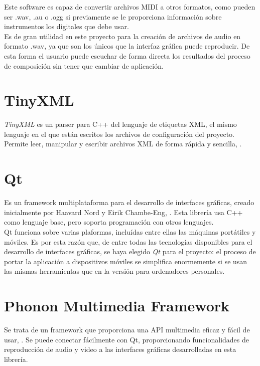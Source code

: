 Este software es capaz de convertir archivos MIDI a otros formatos, como pueden ser .wav, .au o .ogg si previamente se le proporciona información sobre instrumentos los digitales que debe usar.\\

Es de gran utilidad en este proyecto para la creación de archivos de audio en formato .wav, ya que son los únicos que la interfaz gráfica puede reproducir. De esta forma el usuario puede escuchar de forma directa los resultados del proceso de composición sin tener que cambiar de aplicación.

\section{TinyXML}
\label{sec:TinyXML}

\emph{TinyXML} es un parser para C++ del lenguaje de etiquetas XML, el mismo lenguaje en el que están escritos los archivos de configuración del proyecto. Permite leer, manipular y escribir archivos XML de forma rápida y sencilla, \cite{tinyxml}.\\

\section{Qt}
\label{sec:Qt}

Es un framework multiplataforma para el desarrollo de interfaces gráficas, creado inicialmente por Haavard Nord y Eirik Chambe-Eng, \cite{qtlibs}. Esta librería usa C++ como lenguaje base, pero soporta programación con otros lenguajes.\\

Qt funciona sobre varias plaformas, incluídas entre ellas las máquinas portátiles y móviles. Es por esta razón que, de entre todas las tecnologías disponibles para el desarrollo de interfaces gráficas, se haya elegido \emph{Qt} para el proyecto: el proceso de portar la aplicación a dispositivos móviles se simplifica enormemente si se usan las mismas herramientas que en la versión para ordenadores personales.

\section{Phonon Multimedia Framework}
\label{sec:Phonon}

Se trata de un framework que proporciona una API multimedia eficaz y fácil de usar, \cite{phononOverview}. Se puede conectar fácilmente con Qt, proporcionando funcionalidades de reproducción de audio y video a las interfaces gráficas desarrolladas en esta librería.\\

